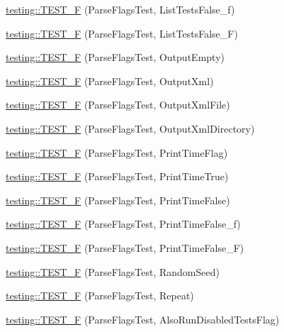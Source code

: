 \begin{DoxyCompactItemize}
\item 
\mbox{\hyperlink{namespacetesting_a381c90024f28d66ed25e687a94c8b329}{testing\+::\+T\+E\+S\+T\+\_\+F}} (Parse\+Flags\+Test, List\+Tests\+False\+\_\+f)
\item 
\mbox{\hyperlink{namespacetesting_a05a7a818dedb4fdf5b0aac632d97e2dc}{testing\+::\+T\+E\+S\+T\+\_\+F}} (Parse\+Flags\+Test, List\+Tests\+False\+\_\+F)
\item 
\mbox{\hyperlink{namespacetesting_a27d34eacec5189fae8349b4a96aea619}{testing\+::\+T\+E\+S\+T\+\_\+F}} (Parse\+Flags\+Test, Output\+Empty)
\item 
\mbox{\hyperlink{namespacetesting_addbcb86017a124d8e6afbc6933b7c251}{testing\+::\+T\+E\+S\+T\+\_\+F}} (Parse\+Flags\+Test, Output\+Xml)
\item 
\mbox{\hyperlink{namespacetesting_aba922f243ca36645e7001596dc61ad9b}{testing\+::\+T\+E\+S\+T\+\_\+F}} (Parse\+Flags\+Test, Output\+Xml\+File)
\item 
\mbox{\hyperlink{namespacetesting_aa3fd714488b3f3caa6af5394a63d38f4}{testing\+::\+T\+E\+S\+T\+\_\+F}} (Parse\+Flags\+Test, Output\+Xml\+Directory)
\item 
\mbox{\hyperlink{namespacetesting_a9442229ba2091a4f892a36519f458be8}{testing\+::\+T\+E\+S\+T\+\_\+F}} (Parse\+Flags\+Test, Print\+Time\+Flag)
\item 
\mbox{\hyperlink{namespacetesting_ae26478ca77d32fa5a519294b23a423f2}{testing\+::\+T\+E\+S\+T\+\_\+F}} (Parse\+Flags\+Test, Print\+Time\+True)
\item 
\mbox{\hyperlink{namespacetesting_aae74ae96560ea57a139eb6c8f502aa35}{testing\+::\+T\+E\+S\+T\+\_\+F}} (Parse\+Flags\+Test, Print\+Time\+False)
\item 
\mbox{\hyperlink{namespacetesting_a4d0ef8499ed9a23e0e4b6d8ae66a61c8}{testing\+::\+T\+E\+S\+T\+\_\+F}} (Parse\+Flags\+Test, Print\+Time\+False\+\_\+f)
\item 
\mbox{\hyperlink{namespacetesting_a776cc6047fe6c96564bea11143aebc3e}{testing\+::\+T\+E\+S\+T\+\_\+F}} (Parse\+Flags\+Test, Print\+Time\+False\+\_\+F)
\item 
\mbox{\hyperlink{namespacetesting_a8c91f18e468506e7d64fa57fdec303c4}{testing\+::\+T\+E\+S\+T\+\_\+F}} (Parse\+Flags\+Test, Random\+Seed)
\item 
\mbox{\hyperlink{namespacetesting_aad196be6244a5fd202ea05c8c409b0d1}{testing\+::\+T\+E\+S\+T\+\_\+F}} (Parse\+Flags\+Test, Repeat)
\item 
\mbox{\hyperlink{namespacetesting_a579ed858a912b7fd5ff7b68f3c0d9184}{testing\+::\+T\+E\+S\+T\+\_\+F}} (Parse\+Flags\+Test, Also\+Run\+Disabled\+Tests\+Flag)

\end{DoxyCompactItemize}
